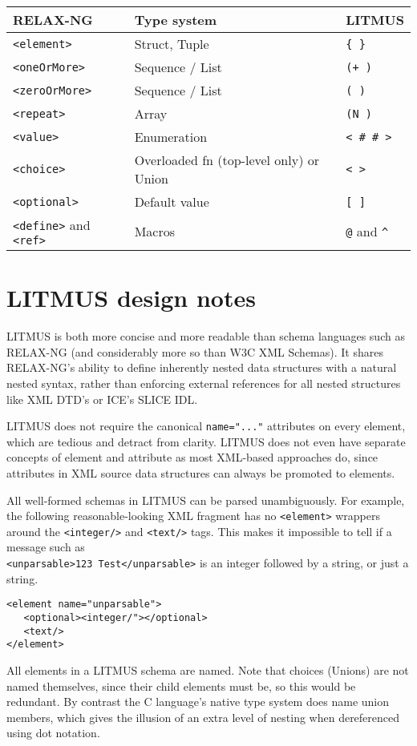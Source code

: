 \documentclass[12pt,a4paper,twoside]{article}
\renewcommand{\_}{\texttt{\symbol{95}}}
\begin{document}
\begin{tabular}{l|l|l}
\hline
RELAX-NG \rule[-2mm]{0mm}{6.5mm} & Type system & LITMUS\\
\hline
\verb^<element>^ \rule[0mm]{0mm}{4.5mm} & Struct, Tuple & \verb^{ }^\\
\verb^<oneOrMore>^ & Sequence / List & \verb^(+ )^\\
\verb^<zeroOrMore>^ & Sequence / List & \verb^( )^\\
\verb^<repeat>^ & Array & \verb^(N )^\\
\verb^<value>^ & Enumeration & \verb^< # # >^\\
\verb^<choice>^ & Overloaded fn (top-level only) or Union & \verb^< >^\\
\verb^<optional>^ & Default value & \verb^[ ]^\\
\verb^<define>^ and \verb^<ref>^ \rule[-2mm]{0mm}{2mm} & Macros
   & \verb^@^ and \verb~^~\\
\hline
\end{tabular}

\section{LITMUS design notes}

LITMUS is both more concise and more readable than schema languages such as
RELAX-NG (and considerably more so than W3C XML Schemas). It shares RELAX-NG's
ability to define inherently nested data structures with a natural nested
syntax, rather than enforcing external references for all nested structures
like XML DTD's or ICE's SLICE IDL.

LITMUS does not require the canonical \verb^name="..."^ attributes on
every element, which are tedious and detract from clarity. LITMUS does
not even have separate concepts of element and attribute as most
XML-based approaches do, since attributes in XML source data structures
can always be promoted to elements.

All well-formed schemas in LITMUS can be parsed unambiguously.
For example, the following reasonable-looking XML fragment has no
\verb^<element>^ wrappers around the \verb^<integer/>^ and
\verb^<text/>^ tags. This makes it impossible to tell if a message such as\\
\verb^<unparsable>123 Test</unparsable>^ is an integer
followed by a string, or just a string.

\begin{verbatim}
<element name="unparsable">
   <optional><integer/"></optional>
   <text/>
</element>
\end{verbatim}

All elements in a LITMUS schema are named.
Note that choices (Unions) are not named themselves, since their child elements
must be, so this would be redundant. By contrast the C language's native
type system does name union members, which gives the
illusion of an extra level of nesting when dereferenced using dot notation.
\end{document}

